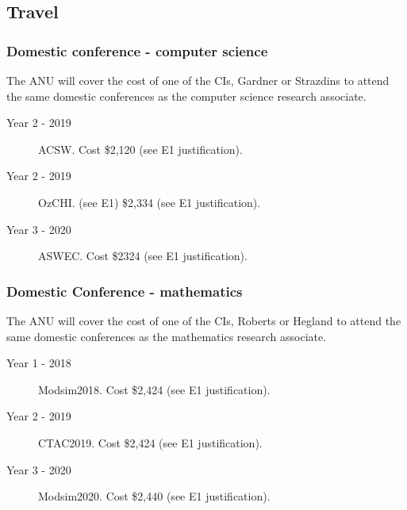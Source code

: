 \documentclass[a4paper,twoside,12pt,compact]{article}
\begin{document}
\subsection*{Travel}

\subsubsection*{Domestic conference - computer science}

The ANU will cover the cost of one of the CIs, Gardner or Strazdins 
to attend the  same domestic conferences as the computer science 
research associate. 


\begin{description}
\item[Year 2 - 2019] ACSW. Cost \$2,120  (see E1 justification).

\item[Year 2 - 2019] OzCHI. (see E1) \$2,334 (see E1 justification).

\item[Year 3 -  2020] ASWEC.  Cost \$2324 (see E1 justification).

\end{description}

\subsubsection*{Domestic Conference - mathematics}

The ANU will cover the cost of one of the CIs, Roberts or Hegland 
to attend the  same domestic conferences as the mathematics 
research associate. 


\begin{description}
\item[Year 1 - 2018] Modsim2018. Cost \$2,424  (see E1 justification).

\item[Year 2 - 2019] CTAC2019. Cost \$2,424  (see E1 justification).

\item[Year 3 - 2020] Modsim2020.  Cost \$2,440  (see E1 justification).


\end{description}
\end{document}
